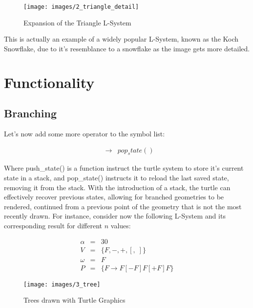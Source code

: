 \documentclass{acmtog}
\begin{document}
\begin{figure}[!htp]
  \begin{center}
    \texttt{[image: images/2\_triangle\_detail]}
    \caption{Expansion of the Triangle L-System \label{fig:triangle_detail}}
    \end{center}
\end{figure}

This is actually an example of a widely popular L-System, known as the Koch Snowflake, due to it's resemblance to a snowflake as the image gets more detailed.

\section{Functionality}
\label{sec:functionality}

\subsection{Branching}
\label{subsec:branching}

Let's now add some more operator to the symbol list:

\begin{eqnarray*}
    [ & \rightarrow &  push_state() \\
    ] & \rightarrow &  pop_state() 
\end{eqnarray*}

Where push\_state() is a function instruct the turtle system to store it's current state in a stack, and pop\_state() instructs it to reload the last saved state, removing it from the stack. With the introduction of a stack, the turtle can effectively recover previous states, allowing for branched geometries to be rendered, continued from a previous point of the geometry that is not the most recently drawn. For instance, consider now the following L-System and its corresponding result for different $n$ values:

\begin{eqnarray*}
  \alpha  &=& 30                         \\
  V       &=& \{F, -, +, [,\; ]\}        \\
  \omega  &=& F                           \\
  P       &=& \{F \rightarrow F[-F]F[+F]F\} 
\end{eqnarray*}

\begin{figure}[!htp]
  \begin{center}
    \texttt{[image: images/3\_tree]}
    \caption{Trees drawn with Turtle Graphics \label{fig:tree}}
    \end{center}
\end{figure}
\end{document}
